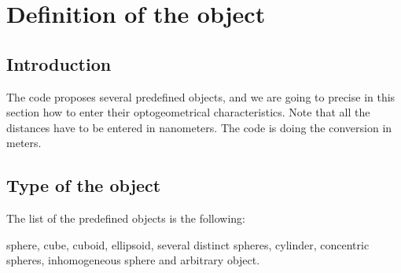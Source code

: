 \chapter{Definition of the object}\label{chap4}

\minitoc

\section{Introduction}

The code proposes several predefined objects, and we are going to
precise in this section how to enter their optogeometrical
characteristics.  Note that all the distances have to be entered in
nanometers. The code is doing the conversion in meters.


\section{Type of the object}


The list of the predefined objects is the following: 

sphere, cube, cuboid, ellipsoid, several distinct spheres, cylinder,
concentric spheres, inhomogeneous sphere and arbitrary object.

